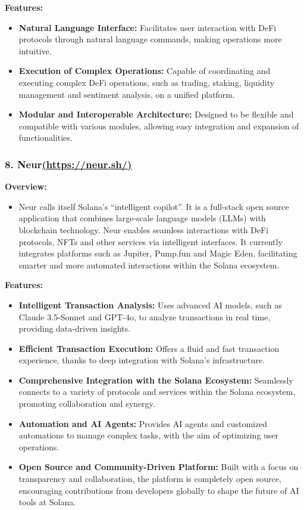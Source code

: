 \documentclass[
]{article}
\providecommand{\tightlist}{%
  \setlength{\itemsep}{0pt}\setlength{\parskip}{0pt}}
\begin{document}
\textbf{Features:}

\begin{itemize}
\tightlist
\item
  \textbf{Natural Language Interface:} Facilitates user interaction with
  DeFi protocols through natural language commands, making operations
  more intuitive.
\item
  \textbf{Execution of Complex Operations:} Capable of coordinating and
  executing complex DeFi operations, such as trading, staking, liquidity
  management and sentiment analysis, on a unified platform.
\item
  \textbf{Modular and Interoperable Architecture:} Designed to be
  flexible and compatible with various modules, allowing easy
  integration and expansion of functionalities.
\end{itemize}

\hypertarget{neurhttpsneur.sh}{%
\subsubsection{\texorpdfstring{8.
Neur\href{https://neur.sh/}{(https://neur.sh/)}}{8. Neur(https://neur.sh/)}}\label{neurhttpsneur.sh}}

\textbf{Overview:}

\begin{itemize}
\tightlist
\item
  Neur calls itself Solana's ``intelligent copilot''. It is a full-stack
  open source application that combines large-scale language models
  (LLMs) with blockchain technology. Neur enables seamless interactions
  with DeFi protocols, NFTs and other services via intelligent
  interfaces. It currently integrates platforms such as Jupiter,
  Pump.fun and Magic Eden, facilitating smarter and more automated
  interactions within the Solana ecosystem.
\end{itemize}

\textbf{Features:}

\begin{itemize}
\tightlist
\item
  \textbf{Intelligent Transaction Analysis:} Uses advanced AI models,
  such as Claude 3.5-Sonnet and GPT-4o, to analyze transactions in real
  time, providing data-driven insights.
\item
  \textbf{Efficient Transaction Execution:} Offers a fluid and fast
  transaction experience, thanks to deep integration with Solana's
  infrastructure.
\item
  \textbf{Comprehensive Integration with the Solana Ecosystem:}
  Seamlessly connects to a variety of protocols and services within the
  Solana ecosystem, promoting collaboration and synergy.
\item
  \textbf{Automation and AI Agents:} Provides AI agents and customized
  automations to manage complex tasks, with the aim of optimizing user
  operations.
\item
  \textbf{Open Source and Community-Driven Platform:} Built with a focus
  on transparency and collaboration, the platform is completely open
  source, encouraging contributions from developers globally to shape
  the future of AI tools at Solana.
\end{itemize}
\end{document}
